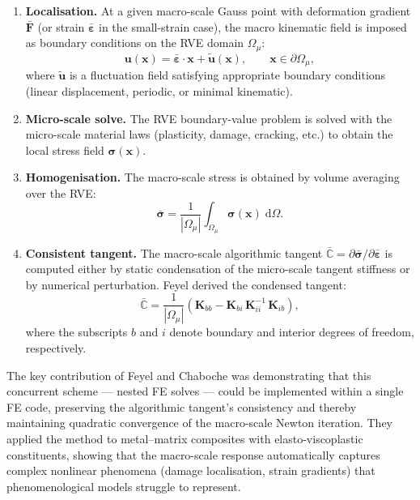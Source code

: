 \begin{enumerate}[label=(\roman*)]
  \item \textbf{Localisation.}  At a given macro-scale Gauss point
    with deformation gradient $\bar{\bm{F}}$ (or strain
    $\bar{\bm{\varepsilon}}$ in the small-strain case), the macro
    kinematic field is imposed as boundary conditions on the RVE
    domain $\Omega_\mu$:
    \begin{equation}
      \label{eq:fe2-bc}
      \mathbf{u}(\mathbf{x}) =
        \bar{\bm{\varepsilon}} \cdot \mathbf{x}
        + \tilde{\mathbf{u}}(\mathbf{x}),
      \qquad \mathbf{x} \in \partial\Omega_\mu,
    \end{equation}
    where $\tilde{\mathbf{u}}$ is a fluctuation field satisfying
    appropriate boundary conditions (linear displacement, periodic,
    or minimal kinematic).

  \item \textbf{Micro-scale solve.}  The RVE boundary-value problem
    is solved with the micro-scale material laws (plasticity, damage,
    cracking, etc.) to obtain the local stress field
    $\bm{\sigma}(\mathbf{x})$.

  \item \textbf{Homogenisation.}  The macro-scale stress is obtained
    by volume averaging over the RVE:
    \begin{equation}
      \label{eq:fe2-homog}
      \bar{\bm{\sigma}} = \frac{1}{|\Omega_\mu|}
        \int_{\Omega_\mu} \bm{\sigma}(\mathbf{x}) \; \mathrm{d}\Omega.
    \end{equation}

  \item \textbf{Consistent tangent.}  The macro-scale algorithmic
    tangent $\bar{\mathbb{C}} = \partial\bar{\bm{\sigma}}
    / \partial\bar{\bm{\varepsilon}}$ is computed either by static
    condensation of the micro-scale tangent stiffness or by numerical
    perturbation.  Feyel \cite{Feyel1999} derived the condensed
    tangent:
    \begin{equation}
      \label{eq:fe2-cond-tangent}
      \bar{\mathbb{C}} = \frac{1}{|\Omega_\mu|}
        \left(
          \mathbf{K}_{bb} -
          \mathbf{K}_{bi} \, \mathbf{K}_{ii}^{-1} \, \mathbf{K}_{ib}
        \right),
    \end{equation}
    where the subscripts $b$ and $i$ denote boundary and interior
    degrees of freedom, respectively.
\end{enumerate}

\noindent
The key contribution of Feyel and Chaboche was demonstrating that
this concurrent scheme --- nested FE solves --- could be implemented
within a single FE code, preserving the algorithmic tangent's
consistency and thereby maintaining quadratic convergence of the
macro-scale Newton iteration.  They applied the method to
metal--matrix composites with elasto-viscoplastic constituents,
showing that the macro-scale response automatically captures complex
nonlinear phenomena (damage localisation, strain gradients) that
phenomenological models struggle to represent.

